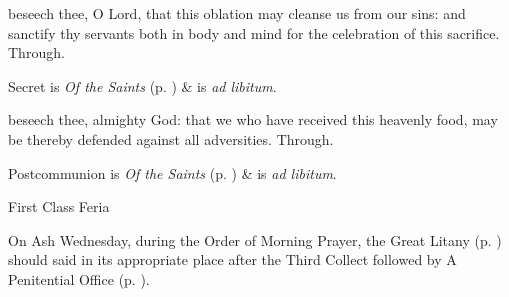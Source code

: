\secret
{} beseech thee, O Lord, that this oblation may cleanse us from our sins: and sanctify thy servants both in body and mind for the celebration of this sacrifice. Through.
\begin{rubric}
     Secret is \emph{Of the Saints} (p. \pageref{SPSaints}) \&  is \emph{ad libitum}.
\end{rubric}
\postcommunion
{} beseech thee, almighty God: that we who have received this heavenly food, may be thereby defended against all adversities. Through.
\begin{rubric}
     Postcommunion is \emph{Of the Saints} (p. \pageref{SPSaints}) \&  is \emph{ad libitum}.
\end{rubric}


\begin{inhead}
{First Class Feria}
\end{inhead}
\par\noindent
\begin{rubric}
    On Ash Wednesday, during the Order of Morning Prayer, the Great Litany (p. \pageref{litany}) should said in its appropriate place after the Third Collect followed by A Penitential Office (p. \pageref{penitential}).
\end{rubric}

